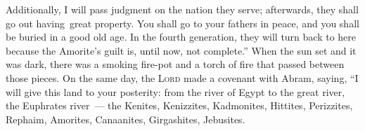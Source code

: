 \begin{inparaenum}
   Additionally, I will pass judgment on the nation they serve; afterwards, they shall go out having\understood\ great property.%
   You shall go to your fathers in peace, and you shall be buried in a good old age.%
   In the fourth generation, they will turn back to here because the Amorite's guilt is, until now, not complete.''%
   When the sun set and it was dark, there was a smoking fire-pot and a torch of fire that passed between those pieces.%
   On the same day, the \textsc{Lord} made a covenant with Abram, saying, ``I will give this land to your posterity: from the river of Egypt to the great river, the Euphrates river~---%
   the Kenites, Kenizzites, Kadmonites,%
   Hittites, Perizzites, Rephaim,%
   Amorites, Canaanites, Girgashites, Jebusites.%
\end{inparaenum}
